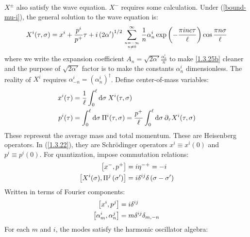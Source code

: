 $X^\pm$ also satisfy the wave equation. $X^-$ requires some calculation. Under (\ref{bound-mu-i}), the general solution to the wave equation is: 
\begin{equation}
	X^{i}(\tau, \sigma)=x^{i}+\frac{p^{i}}{p^{+}} \tau+i\left(2 \alpha^{\prime}\right)^{1 / 2} \sum_{n=-\infty \atop n \neq 0}^{\infty} \frac{1}{n} \alpha_{n}^{i} \exp \left(-\frac{\pi i n c \tau}{\ell}\right) \cos \frac{\pi n \sigma}{\ell} \label{1.3.22}
\end{equation}
where we write the expansion coefficient $A_n=\sqrt{2\alpha'}\frac{\alpha_n^i}{n}$ to make \eqref{1.3.25b} cleaner and the purpose of $\sqrt{2\alpha'}$ factor is to make the constants $\alpha_n^i$ dimensionless. The reality of $X^i$ requires $\alpha_{-n}^{i}=\left(\alpha_{n}^{i}\right)^{\dagger}$. 
Define center-of-mass variables: 
\begin{subequations}
	\begin{align}
		x^{i}(\tau)&=\frac{1}{\ell} \int_{0}^{\ell} \mathrm{d} \sigma\: X^{i}(\tau, \sigma) \\
		p^{i}(\tau)&=\int_{0}^{\ell} \mathrm{d} \sigma\: \Pi^{i}(\tau, \sigma)=\frac{p^{+}}{\ell} \int_{0}^{\ell} \mathrm{d} \sigma \:\partial_{\tau} X^{i}(\tau, \sigma)
	\end{align}
\end{subequations}
These represent the average mass and total momentum. These are Heisenberg operators. 
In (\ref{1.3.22}), they are Schrödinger operators $x^{i} \equiv x^{i}(0)$ and $p^{i} \equiv p^{i}(0)$. 
For quantization, impose commutation relations: 
\begin{subequations}
	\begin{align}
		\left[x^{-}, p^{+}\right]&=i \eta^{-+}=-i  \label{1.3.24a}\\
		\left[X^{i}(\sigma), \Pi^{j}\left(\sigma^{\prime}\right)\right]&=i \delta^{i j} \delta\left(\sigma-\sigma^{\prime}\right)
		\label{1.3.24b}
	\end{align}
\end{subequations}
Written in terms of Fourier components: 
\begin{subequations}
	\begin{align}
		\left[x^{i}, p^{j}\right]&=i \delta^{i j}   \label{1.3.25a}\\
		\left[\alpha_{m}^{i}, \alpha_{n}^{j}\right]&=m \delta^{i j} \delta_{m,-n}   \label{1.3.25b}
	\end{align} \label{1.3.25}
\end{subequations}
\noindent For each $m$ and $i$, the modes satisfy the harmonic oscillator algebra: 
